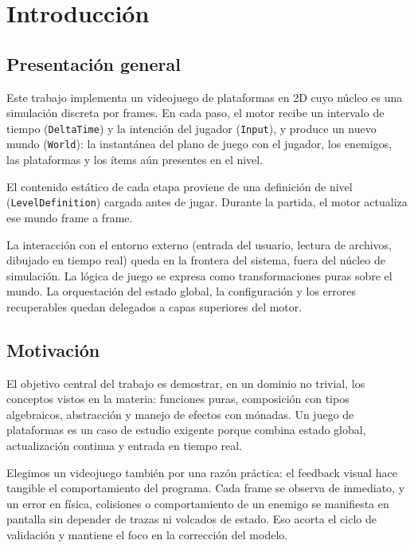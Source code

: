 \section{Introducción}
\label{sec:introduccion}

\subsection{Presentación general}
\label{subsec:intro-presentacion}

Este trabajo implementa un videojuego de plataformas en 2D cuyo núcleo es una simulación
discreta por frames. En cada paso, el motor recibe un intervalo de tiempo
(\texttt{DeltaTime}) y la intención del jugador (\texttt{Input}), y produce un nuevo
mundo (\texttt{World}): la instantánea del plano de juego con el jugador, los enemigos, las
plataformas y los ítems aún presentes en el nivel.

El contenido estático de cada etapa proviene de una definición de nivel
(\texttt{LevelDefinition}) cargada antes de jugar. Durante la partida, el motor actualiza
ese mundo frame a frame.

La interacción con el entorno externo (entrada del usuario, lectura de archivos, dibujado
en tiempo real) queda en la frontera del sistema, fuera del núcleo de simulación. La
lógica de juego se expresa como transformaciones puras sobre el mundo. La orquestación
del estado global, la configuración y los errores recuperables quedan delegados a capas
superiores del motor.

\subsection{Motivación}
\label{subsec:intro-motivacion}

El objetivo central del trabajo es demostrar, en un dominio no trivial, los conceptos
vistos en la materia: funciones puras, composición con tipos algebraicos, abstracción y
manejo de efectos con mónadas. Un juego de plataformas es un caso de estudio exigente
porque combina estado global, actualización continua y entrada en tiempo real.

Elegimos un videojuego también por una razón práctica: el feedback visual hace
tangible el comportamiento del programa. Cada frame se observa de inmediato, y un
error en física, colisiones o comportamiento de un enemigo se manifiesta en pantalla
sin depender de trazas ni volcados de estado. Eso acorta el ciclo de validación y mantiene
el foco en la corrección del modelo.

